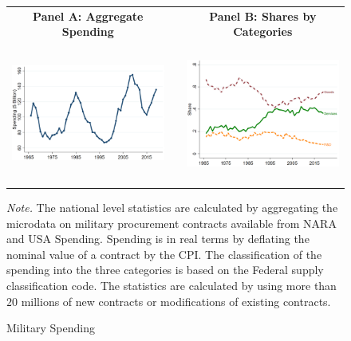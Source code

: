 \documentclass[dv_diss_main.tex]{subfiles}
\begin{document}
\begin{figure}[H]
\begin{center}
    \begin{tabular}[c]{ccc}
    
    \normalsize{\bf Panel A: Aggregate Spending} & & \normalsize{\bf Panel B: Shares by Categories} \\
    {\includegraphics[height=1.8in,width=2.9in]{figures/graph_milspend_aggregate.png}} & & {\includegraphics[height=1.8in,width=2.9in]{figures/graph_composition_shares.png}} \\[0.1in]
    
    \end{tabular}
   \caption{Military Spending}\label{fig:share_comp}
\end{center}
    
    
    \footnotesize{\textit{Note. } The national level statistics are calculated by aggregating the microdata on military procurement contracts available from NARA and USA Spending. Spending is in real terms by deflating the nominal value of a contract by the CPI. The classification of the spending into the three categories is based on the Federal supply classification code. The statistics are calculated by using more than $20$ millions of new contracts or modifications of existing contracts.}


\end{figure}
\newpage
\end{document}
